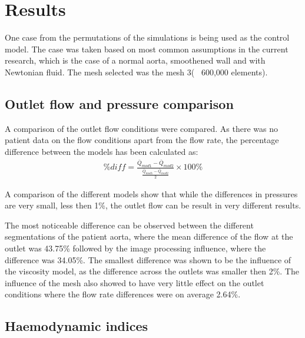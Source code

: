 \chapter{Results}
\label{chapterlabel6}

One case from the permutations of the simulations is being used as the control model. The case was taken based on most common assumptions in the current research, which is the case of a normal aorta, smoothened wall and with Newtonian fluid. The mesh selected was the mesh 3(~ 600,000 elements).

\section{Outlet flow and pressure comparison}
A comparison of the outlet flow conditions were compared. As there was no patient data on the flow conditions apart from the flow rate, the percentage difference between the models has been calculated as:
\begin{align}
    \% diff = \frac{\bar{Q}_{mod1}-\bar{Q}_{mod2}}{\frac{\bar{Q}_{mod1}-\bar{Q}_{mod2}}{2}} \times 100 \%
\end{align}

A comparison of the different models show  that while the differences in pressures are very small, less then 1\%, the outlet flow can be result in very different results. \par

The most noticeable difference can be observed between the different segmentations of the patient aorta, where the mean difference of the flow at the outlet was 43.75\% followed by the image processing influence, where the difference was 34.05\%. The smallest difference was shown to be the influence of the viscosity model, as the difference across the outlets was smaller then 2\%. The influence of the mesh also showed to have very little effect on the outlet conditions where the flow rate differences were on average 2.64\%. \par

\section{Haemodynamic indices}

